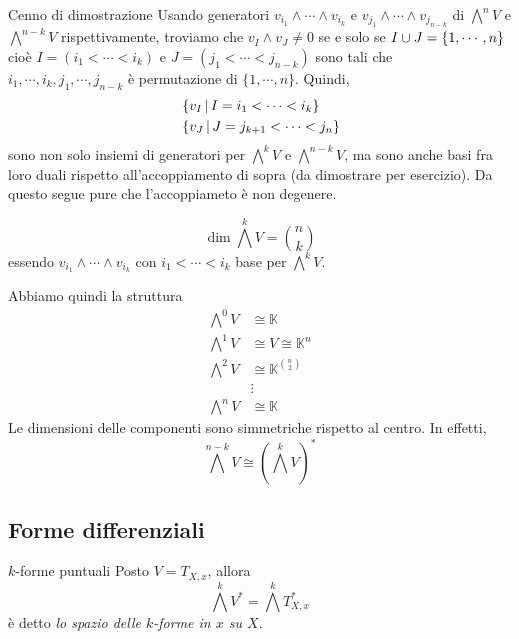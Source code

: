 \documentclass[a4paper]{article}
\begin{document}
\begin{snippetproof}{Cenno di dimostrazione}
    Usando generatori
    \(v_{i_1} \wedge \cdots \wedge v_{i_k}\)
    e \(v_{j_1} \wedge \cdots \wedge v_{j_{n-k}}\)
    di \(\bigwedge^n V\) e \(\bigwedge^{n-k} V\) rispettivamente, 
    troviamo che \(v_I \wedge v_J \neq 0\)
    se e solo se \(I \cup J = \{1, \cdots, n\}\)
    cioè \(I = (i_1 < \cdots < i_k)\)
    e \(J = (j_1 < \cdots < j_{n-k})\)
    sono tali che \(i_1, \cdots, i_k, j_1, \cdots, j_{n-k}\)
    è permutazione di \(\{1, \cdots, n\}\).
    Quindi, \begin{align*}
        &\left\{
            v_I \,|\, I = i_1 < \cdots < i_k
        \right\} \\
        &\left\{
            v_J \,|\, J = j_{k+1} < \cdots < j_n
        \right\}
    \end{align*}
    sono non solo insiemi di generatori per \(\bigwedge^k V\)
    e \(\bigwedge^{n-k} V\), ma sono anche basi fra loro duali rispetto
    all'accoppiamento di sopra (da dimostrare per esercizio).
    Da questo segue pure che l'accoppiameto è non degenere.
\end{snippetproof}

\begin{snippetcorollary}{}
    \[
        \dim \bigwedge^k V = \binom{n}{k}
    \]
    essendo \(v_{i_1} \wedge \cdots \wedge v_{i_k}\)
    con \(i_1 < \cdots < i_k\)
    base per \(\bigwedge^k V\).
\end{snippetcorollary}

Abbiamo quindi la struttura \begin{align*}
    \bigwedge^0 V &\cong \mathbb K \\
    \bigwedge^1 V &\cong V \cong \mathbb K^n \\
    \bigwedge^2 V &\cong \mathbb K^{\binom{n}{2}} \\
    &\vdots \\
    \bigwedge^n V &\cong \mathbb K
\end{align*}
Le dimensioni delle componenti sono simmetriche rispetto al centro.
In effetti, \[
    \bigwedge^{n-k} V \cong \left(\bigwedge^k V\right)^*
\]

\subsection{Forme differenziali}

\begin{snippetdefinition}{\(k\)-forme puntuali}
    Posto \(V = T_{X,x}\),
    allora \[
        \bigwedge^k V^* = \bigwedge^k T_{X,x}^*
    \]
    è detto \emph{lo spazio delle \(k\)-forme in \(x\) su \(X\)}.
\end{snippetdefinition}
\end{document}
